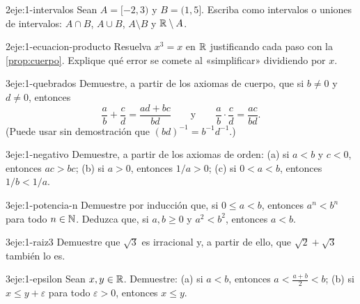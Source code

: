 \begin{ejercicio}{2}{eje:1-intervalos}
Sean $A=[-2,3)$ y $B=(1,5]$. Escriba como intervalos o uniones de intervalos: $A\cap B$, $A\cup B$, $A\setminus B$ y $\mathbb{R}\setminus A$.
\end{ejercicio}

\begin{ejercicio}{2}{eje:1-ecuacion-producto}
Resuelva $x^3=x$ en $\mathbb{R}$ justificando cada paso con la \cref{prop:cuerpo}. Explique qué error se comete al «simplificar» dividiendo por $x$.
\end{ejercicio}

\begin{ejercicio}{3}{eje:1-quebrados}
Demuestre, a partir de los axiomas de cuerpo, que si $b\neq0$ y $d\neq0$, entonces
\[
\frac ab+\frac cd=\frac{ad+bc}{bd}\qquad\text{y}\qquad \frac ab\cdot\frac cd=\frac{ac}{bd}.
\]
(Puede usar sin demostración que $(bd)^{-1}=b^{-1}d^{-1}$.)
\end{ejercicio}

\begin{ejercicio}{3}{eje:1-negativo}
Demuestre, a partir de los axiomas de orden: (a) si $a<b$ y $c<0$, entonces $ac>bc$; (b) si $a>0$, entonces $1/a>0$; (c) si $0<a<b$, entonces $1/b<1/a$.
\end{ejercicio}

\begin{ejercicio}{3}{eje:1-potencia-n}
Demuestre por inducción que, si $0\le a<b$, entonces $a^n<b^n$ para todo $n\in\mathbb{N}$. Deduzca que, si $a,b\ge 0$ y $a^2<b^2$, entonces $a<b$.
\end{ejercicio}

\begin{ejercicio}{3}{eje:1-raiz3}
Demuestre que $\sqrt3$ es irracional y, a partir de ello, que $\sqrt2+\sqrt3$ también lo es.
\end{ejercicio}

\begin{ejercicio}{3}{eje:1-epsilon}
Sean $x,y\in\mathbb{R}$. Demuestre: (a) si $a<b$, entonces $a<\frac{a+b}{2}<b$; (b) si $x\le y+\varepsilon$ para todo $\varepsilon>0$, entonces $x\le y$.
\end{ejercicio}

